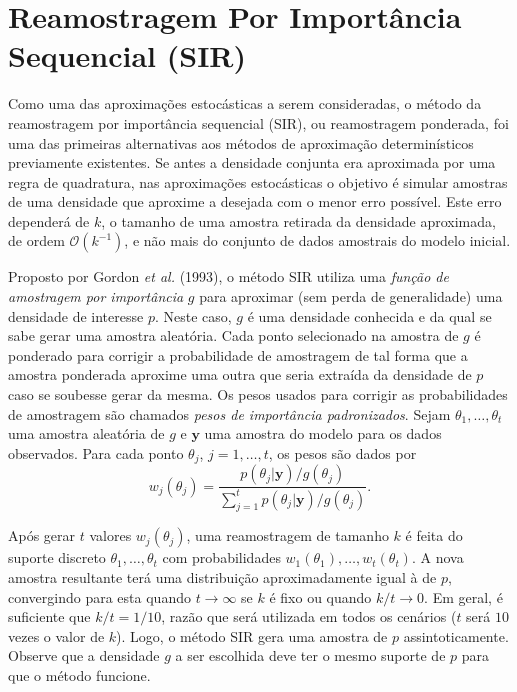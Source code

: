 \section{Reamostragem Por Importância Sequencial (SIR)}\label{sir}

Como uma das aproximações estocásticas a serem consideradas, o método da reamostragem por importância sequencial (SIR), ou reamostragem ponderada, foi uma das primeiras alternativas aos métodos de aproximação determinísticos previamente existentes. Se antes a densidade conjunta era aproximada por uma regra de quadratura, nas aproximações estocásticas o objetivo é simular amostras de uma densidade que aproxime a desejada com o menor erro possível. Este erro dependerá de $k$, o tamanho de uma amostra retirada da densidade aproximada, de ordem $\mathcal{O}(k^{-1})$, e não mais do conjunto de dados amostrais do modelo inicial.

Proposto por Gordon \textit{et al.} (1993)\cite{Gordon1993}, o método SIR utiliza uma \textit{função de amostragem por importância} $g$ para aproximar (sem perda de generalidade) uma densidade de interesse $p$. Neste caso, $g$ é uma densidade conhecida e da qual se sabe gerar uma amostra aleatória. Cada ponto selecionado na amostra de $g$ é ponderado para corrigir a probabilidade de amostragem de tal forma que a amostra ponderada aproxime uma outra que seria extraída da densidade de $p$ caso se soubesse gerar da mesma. Os pesos usados para corrigir as probabilidades de amostragem são chamados \textit{pesos de importância padronizados}. Sejam $\theta_1, \ldots, \theta_t$ uma amostra aleatória de $g$ e $\bm{y}$ uma amostra do modelo para os dados observados. Para cada ponto $\theta_j$, $j = 1, \ldots, t$, os pesos são dados por
\begin{equation}\label{eq:sir_wei}
w_j(\theta_j) = \dfrac{p(\theta_j | \bm{y}) / g(\theta_j)}{\sum_{j=1}^{t} p(\theta_j | \bm{y}) / g(\theta_j)}.
\end{equation}

Após gerar $t$ valores $w_j(\theta_j)$, uma reamostragem de tamanho $k$ é feita do suporte discreto $\theta_1, \ldots, \theta_t$ com probabilidades $w_1(\theta_1), \ldots, w_t(\theta_t)$. A nova amostra resultante terá uma distribuição aproximadamente igual à de $p$, convergindo para esta quando $t \rightarrow \infty$ se $k$ é fixo ou quando $k/t \rightarrow 0$. Em geral, é suficiente que $k/t = 1/10$, razão que será utilizada em todos os cenários ($t$ será $10$ vezes o valor de $k$). Logo, o método SIR gera uma amostra de $p$ assintoticamente. Observe que a densidade $g$ a ser escolhida deve ter o mesmo suporte de $p$ para que o método funcione.

